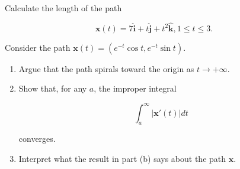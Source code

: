 \documentclass[12pt,letterpaper]{hmcpset}
\newcommand{\pn}[1]{\left( #1 \right)}
\renewcommand{\vec}[1]{\mathbf{#1}}
\let\oldhat\hat
\renewcommand{\hat}[1]{\oldhat{\mathbf{#1}}}
\newcommand{\norm}[1]{\lvert #1 \rvert}
\begin{document}
\begin{solution}
	
\end{solution}

\vfill
\newpage

\begin{problem}[3.2.4]
	Calculate the length of the path
    
    \[
    	\vec{x}(t) = 7 \hat{i} + t \hat{j} + t^2\hat{k}, 1 \leq t \leq 3.
    \]
\end{problem}

\begin{solution}
	
\end{solution}

\vfill
\newpage

\begin{problem}[3.2.14]
	Consider the path $\vec{x}(t) = \pn{e^{-t}\cos{t}, e^{-t}\sin{t}}$.
    
    \begin{enumerate}
		\item Argue that the path spirals toward the origin as $t \to +\infty$.
		\item Show that, for any $a$, the improper integral
        
        \[
        	\int_a^\infty \norm{\vec{x}'(t)}dt
        \]
        
        converges.

		\item Interpret what the result in part (b) says about the path $\vec{x}$.
	\end{enumerate}
\end{problem}

\begin{solution}
	
\end{solution}

\vfill
\newpage
\end{document}
